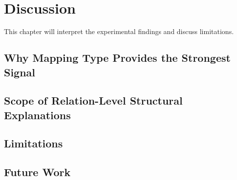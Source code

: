 \section{Discussion}
\label{chap:discussion}

This chapter will interpret the experimental findings and discuss limitations.

\subsection{Why Mapping Type Provides the Strongest Signal}


\subsection{Scope of Relation-Level Structural Explanations}


\subsection{Limitations}


\subsection{Future Work}

